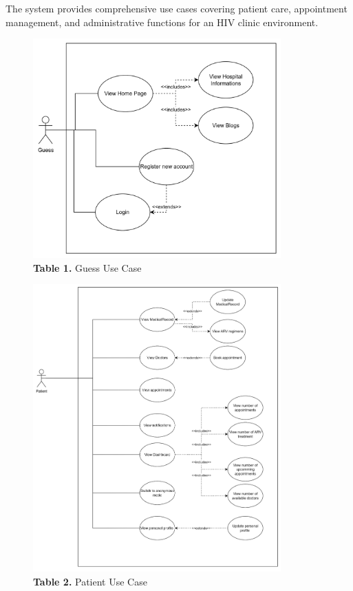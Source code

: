 \documentclass[12pt,a4paper]{article}
\begin{document}
The system provides comprehensive use cases covering patient care, appointment management, and administrative functions for an HIV clinic environment.


\begin{figure}[H]
    \centering
    \includegraphics[width=0.85\textwidth]{diagrams/Picture/Usecase1.png}
    \caption*{\textbf{Table 1.} Guess Use Case}
\end{figure}

\begin{figure}[H]
    \centering
    \includegraphics[width=0.85\textwidth]{diagrams/Picture/Usecase2.png}
    \caption*{\textbf{Table 2.} Patient Use Case}
\end{figure}
\end{document}
